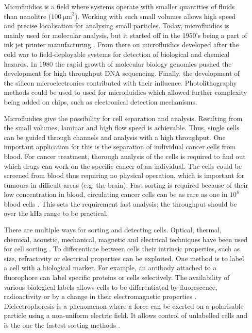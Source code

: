 \documentclass[final]{jyflluk}
\begin{document}
Microfluidics is a field where systems operate with smaller quantities of fluids than nanolitre ($\SI{100}{\micro \metre}^3$). Working with such small volumes allows high speed and precise localisation for analysing small particles. Today, microfluidics is mainly used for molecular analysis, but it started off in the 1950’s being a part of ink jet printer manufacturing \cite{gervais_microfluidic_2011}. From there on microfluidics developed after the cold war to field-deployable systems for detection of biological and chemical hazards. In 1980 the rapid growth of molecular biology genomics pushed the development for high throughput DNA sequencing. Finally, the development of the silicon microelectronics contributed with their influence. Photolithography methods could be used to used for microfluidics which allowed further complexity being added on chips, such as electronical detection mechanisms. \cite{whitesides_origins_2006}

Microfluidics give the possibility for cell separation and analysis. Resulting from the small volumes, laminar and high flow speed is achievable. Thus, single cells can be guided through channels and analysis with a high throughput. One important application for this is the separation of individual cancer cells from blood. For cancer treatment, thorough analysis of the cells is required to find out which drugs can work on the specific cancer of an individual. The cells could be screened from blood thus requiring no physical operation, which is important for tumours in difficult areas (e.g. the brain). Fast sorting is required because of their low concentration in blood, circulating cancer cells can be as rare as one in $10^8$ blood cells \cite{huang_enrichment_2013}. This sets the requirement fast analysis; the throughput should be over the kHz range to be practical. 

There are multiple ways for sorting and detecting cells. Optical, thermal, chemical, acoustic, mechanical, magnetic and electrical techniques have been used for cell sorting \cite{ahn_dielectrophoretic_2006,zhang_towards_2015, voldman_electrical_2006}. To differentiate between cells their intrinsic properties, such as size, refractivity or electrical properties can be exploited. One method is to label a cell with a biological marker.  For example, an antibody attached to a fluorophore can label specific proteins or cells selectively. The availability of various biological labels allows cells to be differentiated by fluorescence, radioactivity or by a change in their electromagnetic properties \cite{wilhelm_universal_2008}. Dielectrophoresis is a phenomenon where a force can be exerted on a polarisable particle using a non-uniform electric field. It allows control of unlabelled cells and is the one the fastest sorting methods \cite{zhang_towards_2015}.
\end{document}
